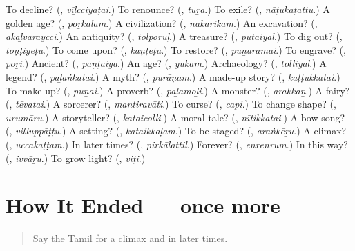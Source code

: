 \begin{tcolorbox}[breakable,colback=teal!4,colframe=teal!35!black,title={Before you move on}]
To decline? (\textbf{}, \emph{vīḻcciyaṭai}.) To renounce? (\textbf{}, \emph{tuṟa}.) To exile? (\textbf{}, \emph{nāṭukaṭattu}.) A golden age? (\textbf{}, \emph{poṟkālam}.) A civilization? (\textbf{}, \emph{nākarikam}.) An excavation? (\textbf{}, \emph{akaḻvārāycci}.) An antiquity? (\textbf{}, \emph{tolporuḷ}.) A treasure? (\textbf{}, \emph{putaiyal}.) To dig out? (\textbf{}, \emph{tōṇṭiyeṭu}.) To come upon? (\textbf{}, \emph{kaṇṭeṭu}.) To restore? (\textbf{}, \emph{puṉaramai}.) To engrave? (\textbf{}, \emph{poṟi}.) Ancient? (\textbf{}, \emph{paṇṭaiya}.) An age? (\textbf{}, \emph{yukam}.) Archaeology? (\textbf{}, \emph{tolliyal}.) A legend? (\textbf{}, \emph{paḻaṅkatai}.) A myth? (\textbf{}, \emph{purāṇam}.) A made-up story? (\textbf{}, \emph{kaṭṭukkatai}.) To make up? (\textbf{}, \emph{puṉai}.) A proverb? (\textbf{}, \emph{paḻamoḻi}.) A monster? (\textbf{}, \emph{arakkaṉ}.) A fairy? (\textbf{}, \emph{tēvatai}.) A sorcerer? (\textbf{}, \emph{mantiravāti}.) To curse? (\textbf{}, \emph{capi}.) To change shape? (\textbf{}, \emph{urumāṟu}.) A storyteller? (\textbf{}, \emph{kataicolli}.) A moral tale? (\textbf{}, \emph{nītikkatai}.) A bow-song? (\textbf{}, \emph{villuppāṭṭu}.) A setting? (\textbf{}, \emph{kataikkaḷam}.) To be staged? (\textbf{}, \emph{araṅkēṟu}.) A climax? (\textbf{}, \emph{uccakaṭṭam}.) In later times? (\textbf{}, \emph{piṟkālattil}.) Forever? (\textbf{}, \emph{eṉṟeṉṟum}.) In this way? (\textbf{}, \emph{ivvāṟu}.) To grow light? (\textbf{}, \emph{viṭi}.)
\end{tcolorbox}
\section[(dialogue)]{How It Ended — once more}

\label{lesson:TA-R346-review-final-346}



\begin{quote}
Say the Tamil for a climax and in later times.
\end{quote}

